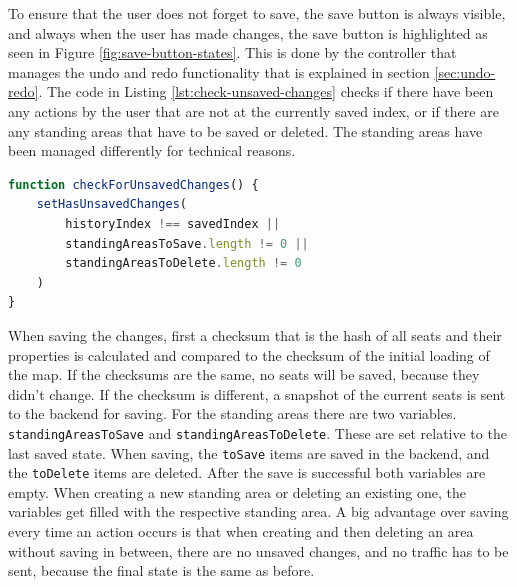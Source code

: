 To ensure that the user does not forget to save, the save button is always visible, and always when the user has made changes, the save button is highlighted as seen in Figure \ref{fig:save-button-states}. This is done by the controller that manages the undo and redo functionality that is explained in section \ref{sec:undo-redo}. The code in Listing \ref{lst:check-unsaved-changes} checks if there have been any actions by the user that are not at the currently saved index, or if there are any standing areas that have to be saved or deleted. The standing areas have been managed differently for technical reasons.

\begin{lstlisting}[language=TypeScript, caption=Check for Unsaved Changes, label=lst:check-unsaved-changes]
function checkForUnsavedChanges() {
    setHasUnsavedChanges(
        historyIndex !== savedIndex ||
        standingAreasToSave.length != 0 ||
        standingAreasToDelete.length != 0
    )
}
\end{lstlisting}

When saving the changes, first a checksum that is the hash of all seats and their properties is calculated and compared to the checksum of the initial loading of the map. If the checksums are the same, no seats will be saved, because they didn't change. If the checksum is different, a snapshot of the current seats is sent to the backend for saving. For the standing areas there are two variables. \texttt{standingAreasToSave} and \texttt{standingAreasToDelete}. These are set relative to the last saved state. When saving, the \texttt{toSave} items are saved in the backend, and the \texttt{toDelete} items are deleted. After the save is successful both variables are empty. When creating a new standing area or deleting an existing one, the variables get filled with the respective standing area. A big advantage over saving every time an action occurs is that when creating and then deleting an area without saving in between, there are no unsaved changes, and no traffic has to be sent, because the final state is the same as before.